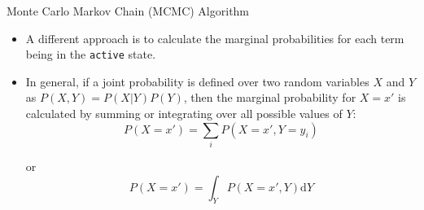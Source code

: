 \documentclass{beamer}
\begin{document}
\begin{frame}{Monte Carlo Markov Chain (MCMC) Algorithm}
 \begin{itemize}
  \item A different approach is to calculate the marginal probabilities for
each term being in the \texttt{active} state. 
\item In general, if a joint
probability is defined over two random variables $X$ and $Y$ as
$P(X,Y)=P(X|Y)P(Y)$, then the marginal
probability for $X=x'$ is calculated by summing or integrating over all
possible values of $Y$:
\begin{equation}
 P(X=x')=\sum_{i} P(X=x',Y=y_i)
\end{equation}


  or
  \begin{equation}
   P(X=x')=\int_Y P(X=x',Y) \mathrm{d}Y
  \end{equation}


 \end{itemize}

 

\end{frame}

\end{document}
